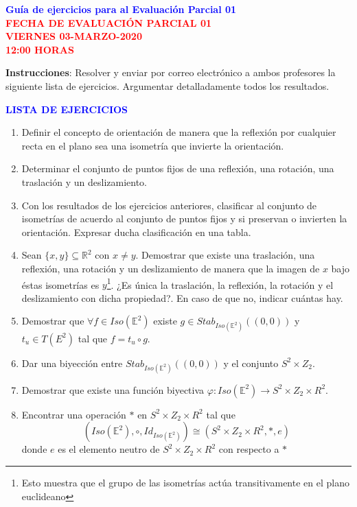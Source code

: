 \documentclass[12pt]{report}
\numberwithin{section}{chapter}
\newcommand{\E}{\mathbb E}
\begin{document}
\begin{center}
\textcolor{blue}{\textbf{\large Guía de ejercicios para al Evaluación Parcial 01}}\\
\vspace{0.5 cm}
\textcolor{red}{\textbf{\large FECHA DE EVALUACIÓN PARCIAL 01 \\ VIERNES 03-MARZO-2020\\ 12:00 HORAS}}
\end{center}

\textbf{Instrucciones}: Resolver y enviar por correo electrónico a ambos profesores la siguiente lista de ejercicios. Argumentar detalladamente todos los resultados.

\vspace{1cm}


\begin{center}
\textcolor{blue}{\textbf{\large LISTA DE EJERCICIOS}}
\end{center}


\begin{enumerate}
\item Definir el concepto de orientación de manera que la reflexión por cualquier recta en el plano sea una isometría que invierte la orientación.

\item Determinar el conjunto de puntos fijos de una reflexión, una rotación, una traslación y un deslizamiento.

\item Con los resultados de los ejercicios anteriores, clasificar al conjunto de isometrías de acuerdo al conjunto de puntos fijos y si preservan o invierten la orientación. Expresar ducha clasificación en una tabla.

\item Sean $\{x, y\}\subseteq \mathbb{R}^2$ con $x \neq y$. Demostrar que existe una traslación, una reflexión, una rotación y un deslizamiento de manera que la imagen de $x$ bajo éstas isometrías es $y$\footnote{Esto muestra que el grupo de las isometrías actúa transitivamente en el plano euclideano}. ¿Es única la traslación, la reflexión, la rotación y el deslizamiento con dicha propiedad?. En caso de que no, indicar cuántas hay.

\item Demostrar que $\forall f\in Iso(\E^2)$ existe $g \in Stab_{Iso(\E^2)}((0,0))$ y $t_u \in T(E^2)$ tal que $f= t_u \circ g$.

\item Dar una biyección entre $Stab_{Iso(\E^2)}((0,0))$ y el conjunto $S^2 \times Z_2$.

\item Demostrar que existe una función biyectiva $\varphi: Iso(\E^2) \to S^2 \times Z_2 \times R^2$.

\item Encontrar una operación $*$ en $S^2 \times Z_2 \times R^2$ tal que 
$$(Iso(\E^2), \circ, Id_{Iso(\E^2)}) \cong( S^2 \times Z_2 \times R^2, *, e)$$
donde $e$ es el elemento neutro de $S^2 \times Z_2 \times R^2$ con respecto a $*$


\end{enumerate}
\end{document}
